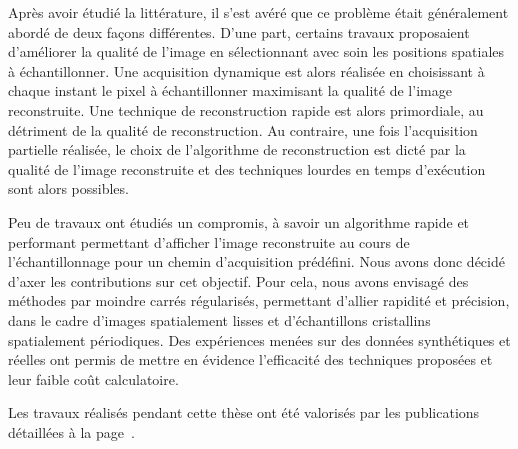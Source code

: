 Après avoir étudié la littérature, il s'est avéré que ce problème était généralement abordé de deux façons différentes. D'une part, certains travaux proposaient d'améliorer la qualité de l'image en sélectionnant avec soin les positions spatiales à échantillonner. Une acquisition dynamique est alors réalisée en choisissant à chaque instant le pixel à échantillonner maximisant la qualité de l'image reconstruite. Une technique de reconstruction rapide est alors primordiale, au détriment de la qualité de reconstruction. Au contraire, une fois l'acquisition partielle réalisée, le choix de l'algorithme de reconstruction est dicté par la qualité de l'image reconstruite et des techniques lourdes en temps d'exécution sont alors possibles. 

Peu de travaux ont étudiés un compromis, à savoir un algorithme rapide et performant permettant d'afficher l'image reconstruite au cours de l'échantillonnage pour un chemin d'acquisition prédéfini.  Nous avons donc décidé d'axer les contributions sur cet objectif. Pour cela, nous avons envisagé des méthodes par moindre carrés régularisés, permettant d'allier rapidité et précision, dans le cadre d'images spatialement lisses et d'échantillons cristallins spatialement périodiques. Des expériences menées sur des données synthétiques et réelles ont permis de mettre en évidence l'efficacité des techniques proposées et leur faible coût calculatoire. 

Les travaux réalisés pendant cette thèse ont été valorisés par les publications détaillées à la page~\pageref{ch-liste-publis}.


 
 
